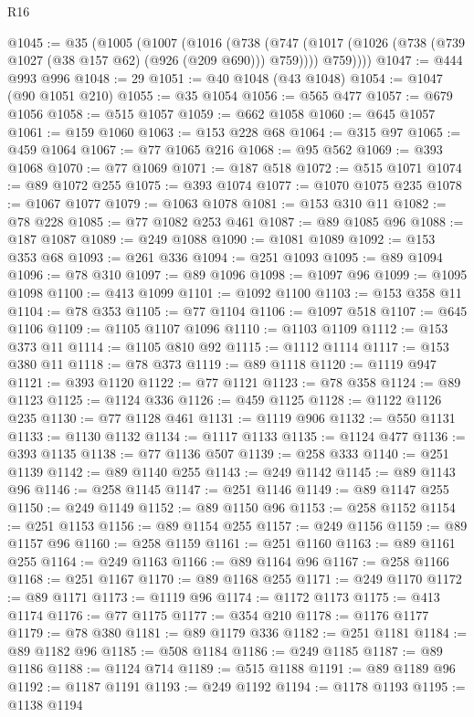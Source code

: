 \begin{lexlean}{R16}
\begin{coremodule}
@1045 := @35
    (@1005
      (@1007
        (@1016
          (@738
            (@747 (@1017 (@1026 (@738 (@739 @1027 (@38 @157 @62) (@926 (@209 @690))) @759))))
            @759))))
@1047 := @444 @993 @996
@1048 := 29
@1051 := @40 @1048 (@43 @1048)
@1054 := @1047 (@90 @1051 @210)
@1055 := @35 @1054
@1056 := @565 @477
@1057 := @679 @1056
@1058 := @515 @1057
@1059 := @662 @1058
@1060 := @645 @1057
@1061 := @159 @1060
@1063 := @153 @228 @68
@1064 := @315 @97
@1065 := @459 @1064
@1067 := @77 @1065 @216
@1068 := @95 @562
@1069 := @393 @1068
@1070 := @77 @1069
@1071 := @187 @518
@1072 := @515 @1071
@1074 := @89 @1072 @255
@1075 := @393 @1074
@1077 := @1070 @1075 @235
@1078 := @1067 @1077
@1079 := @1063 @1078
@1081 := @153 @310 @11
@1082 := @78 @228
@1085 := @77 @1082 @253 @461
@1087 := @89 @1085 @96
@1088 := @187 @1087
@1089 := @249 @1088
@1090 := @1081 @1089
@1092 := @153 @353 @68
@1093 := @261 @336
@1094 := @251 @1093
@1095 := @89 @1094
@1096 := @78 @310
@1097 := @89 @1096
@1098 := @1097 @96
@1099 := @1095 @1098
@1100 := @413 @1099
@1101 := @1092 @1100
@1103 := @153 @358 @11
@1104 := @78 @353
@1105 := @77 @1104
@1106 := @1097 @518
@1107 := @645 @1106
@1109 := @1105 @1107 @1096
@1110 := @1103 @1109
@1112 := @153 @373 @11
@1114 := @1105 @810 @92
@1115 := @1112 @1114
@1117 := @153 @380 @11
@1118 := @78 @373
@1119 := @89 @1118
@1120 := @1119 @947
@1121 := @393 @1120
@1122 := @77 @1121
@1123 := @78 @358
@1124 := @89 @1123
@1125 := @1124 @336
@1126 := @459 @1125
@1128 := @1122 @1126 @235
@1130 := @77 @1128 @461
@1131 := @1119 @906
@1132 := @550 @1131
@1133 := @1130 @1132
@1134 := @1117 @1133
@1135 := @1124 @477
@1136 := @393 @1135
@1138 := @77 @1136 @507
@1139 := @258 @333
@1140 := @251 @1139
@1142 := @89 @1140 @255
@1143 := @249 @1142
@1145 := @89 @1143 @96
@1146 := @258 @1145
@1147 := @251 @1146
@1149 := @89 @1147 @255
@1150 := @249 @1149
@1152 := @89 @1150 @96
@1153 := @258 @1152
@1154 := @251 @1153
@1156 := @89 @1154 @255
@1157 := @249 @1156
@1159 := @89 @1157 @96
@1160 := @258 @1159
@1161 := @251 @1160
@1163 := @89 @1161 @255
@1164 := @249 @1163
@1166 := @89 @1164 @96
@1167 := @258 @1166
@1168 := @251 @1167
@1170 := @89 @1168 @255
@1171 := @249 @1170
@1172 := @89 @1171
@1173 := @1119 @96
@1174 := @1172 @1173
@1175 := @413 @1174
@1176 := @77 @1175
@1177 := @354 @210
@1178 := @1176 @1177
@1179 := @78 @380
@1181 := @89 @1179 @336
@1182 := @251 @1181
@1184 := @89 @1182 @96
@1185 := @508 @1184
@1186 := @249 @1185
@1187 := @89 @1186
@1188 := @1124 @714
@1189 := @515 @1188
@1191 := @89 @1189 @96
@1192 := @1187 @1191
@1193 := @249 @1192
@1194 := @1178 @1193
@1195 := @1138 @1194

\end{coremodule}
\end{lexlean}
